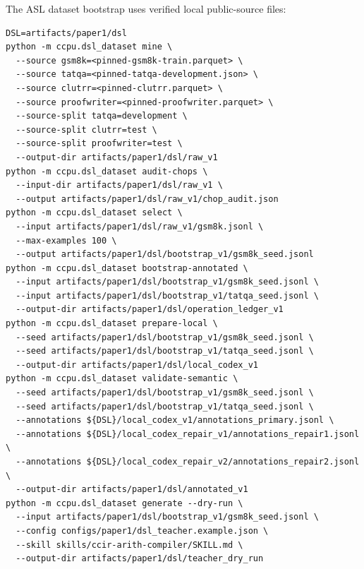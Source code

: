 \documentclass[11pt]{article}
\begin{document}
The ASL dataset bootstrap uses verified local public-source files:

\begin{verbatim}
DSL=artifacts/paper1/dsl
python -m ccpu.dsl_dataset mine \
  --source gsm8k=<pinned-gsm8k-train.parquet> \
  --source tatqa=<pinned-tatqa-development.json> \
  --source clutrr=<pinned-clutrr.parquet> \
  --source proofwriter=<pinned-proofwriter.parquet> \
  --source-split tatqa=development \
  --source-split clutrr=test \
  --source-split proofwriter=test \
  --output-dir artifacts/paper1/dsl/raw_v1
python -m ccpu.dsl_dataset audit-chops \
  --input-dir artifacts/paper1/dsl/raw_v1 \
  --output artifacts/paper1/dsl/raw_v1/chop_audit.json
python -m ccpu.dsl_dataset select \
  --input artifacts/paper1/dsl/raw_v1/gsm8k.jsonl \
  --max-examples 100 \
  --output artifacts/paper1/dsl/bootstrap_v1/gsm8k_seed.jsonl
python -m ccpu.dsl_dataset bootstrap-annotated \
  --input artifacts/paper1/dsl/bootstrap_v1/gsm8k_seed.jsonl \
  --input artifacts/paper1/dsl/bootstrap_v1/tatqa_seed.jsonl \
  --output-dir artifacts/paper1/dsl/operation_ledger_v1
python -m ccpu.dsl_dataset prepare-local \
  --seed artifacts/paper1/dsl/bootstrap_v1/gsm8k_seed.jsonl \
  --seed artifacts/paper1/dsl/bootstrap_v1/tatqa_seed.jsonl \
  --output-dir artifacts/paper1/dsl/local_codex_v1
python -m ccpu.dsl_dataset validate-semantic \
  --seed artifacts/paper1/dsl/bootstrap_v1/gsm8k_seed.jsonl \
  --seed artifacts/paper1/dsl/bootstrap_v1/tatqa_seed.jsonl \
  --annotations ${DSL}/local_codex_v1/annotations_primary.jsonl \
  --annotations ${DSL}/local_codex_repair_v1/annotations_repair1.jsonl \
  --annotations ${DSL}/local_codex_repair_v2/annotations_repair2.jsonl \
  --output-dir artifacts/paper1/dsl/annotated_v1
python -m ccpu.dsl_dataset generate --dry-run \
  --input artifacts/paper1/dsl/bootstrap_v1/gsm8k_seed.jsonl \
  --config configs/paper1/dsl_teacher.example.json \
  --skill skills/ccir-arith-compiler/SKILL.md \
  --output-dir artifacts/paper1/dsl/teacher_dry_run


\end{verbatim}
\end{document}
